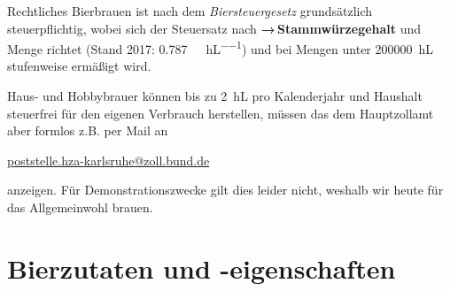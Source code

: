 \documentclass[9pt, ngerman]{beamer}
\newcommand{\forward}[1]{\textbf{→\,#1}}
\begin{document}
\begin{frame}{Rechtliches}
  Bierbrauen ist nach dem \emph{Biersteuergesetz} grundsätzlich steuerpflichtig,
  wobei sich der Steuersatz nach \forward{Stammwürzegehalt} und Menge richtet
  (Stand 2017: \SI{0.787}{\EUR\per\dP\per\hL}) und bei Mengen unter
  \SI{200000}{\hL} stufenweise ermäßigt wird.

  Haus- und Hobbybrauer können bis zu \SI{2}{\hL} pro Kalenderjahr und Haushalt
  steuerfrei für den eigenen Verbrauch herstellen, müssen das dem Hauptzollamt
  aber formlos z.B. per Mail an
  \vspace{-0.5em}
  \begin{center}
    \href{mailto:poststelle.hza-karlsruhe@zoll.bund.de}{poststelle.hza-karlsruhe@zoll.bund.de}
  \end{center}
  \vspace{-0.5em}
  anzeigen. Für Demonstrationszwecke gilt dies leider nicht, weshalb wir heute
  für das Allgemeinwohl brauen.
\end{frame}

\section{Bierzutaten und -eigenschaften}
\end{document}
